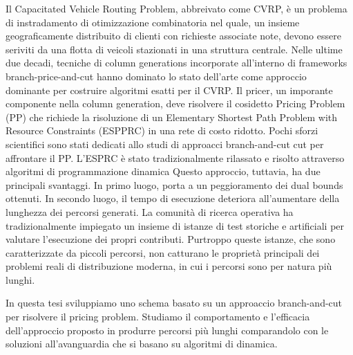 \nodeindent Il Capacitated Vehicle Routing Problem, abbreivato come CVRP,
è un problema di instradamento di otimizzazione combinatoria  nel quale,
un insieme geograficamente distribuito di clienti con richieste associate note,
devono essere seriviti da una flotta di veicoli stazionati in una struttura centrale.
Nelle ultime due decadi,
tecniche di column generations incorporate all'interno di frameworks branch-price-and-cut
hanno dominato lo stato dell'arte come approccio dominante
per costruire algoritmi esatti per il CVRP.
Il pricer, un imporante componente nella column generation, deve risolvere
il cosidetto Pricing Problem (PP) che richiede la risoluzione di un
Elementary Shortest Path Problem with Resource Constraints (ESPPRC)
in una rete di costo ridotto.
Pochi sforzi scientifici sono stati dedicati allo studi di approacci
branch-and-cut cut per affrontare il PP.
L'ESPRC è stato tradizionalmente rilassato e risolto attraverso algoritmi di programmazione dinamica
Questo approccio, tuttavia, ha due principali svantaggi.
In primo luogo, porta a un peggioramento dei dual bounds ottenuti.
In secondo luogo, il tempo di esecuzione deteriora all'aumentare della lunghezza dei percorsi generati.
La comunità di ricerca operativa ha tradizionalmente impiegato
un insieme di istanze di test storiche e artificiali per valutare
l'esecuzione dei propri contributi.
Purtroppo queste istanze, che sono caratterizzate da piccoli percorsi,
non catturano le proprietà principali dei problemi reali di distribuzione moderna,
in cui i percorsi sono per natura più lunghi.

\noindent In questa tesi sviluppiamo
uno schema basato su un approaccio branch-and-cut per risolvere il pricing problem.
Studiamo il comportamento e l'efficacia dell'approccio proposto in produrre percorsi più lunghi
comparandolo con le soluzioni all'avanguardia che si basano su algoritmi di dinamica.
